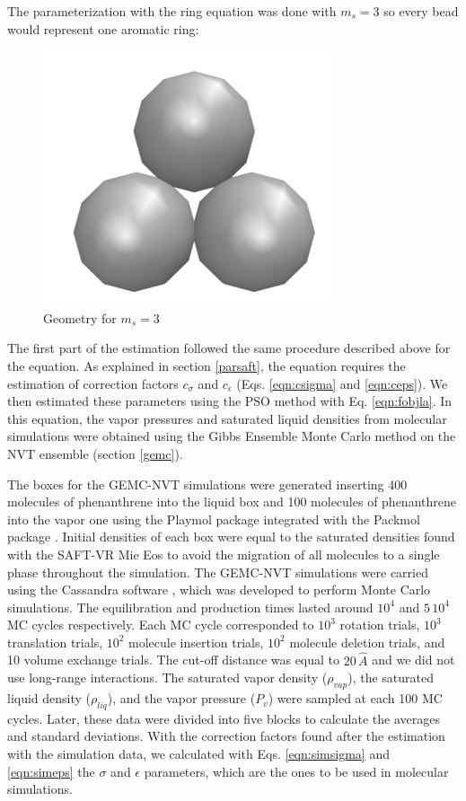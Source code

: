 The parameterization with the  ring equation was done with $m_{s}=3$ so every bead would represent one aromatic ring:

\begin{figure}[th]
	\centering
	\includegraphics[width=0.15\linewidth]{Figures/fe3}
	\caption{Geometry for $m_{s}=3$}
	\label{fig:fen3}
\end{figure}

The first part of the estimation followed the same procedure described above for the  equation. As explained in section \ref{parsaft}, the  equation requires the estimation of correction factors $c_{\sigma}$ and $c_{\epsilon}$ (Eqs. \eqref{eqn:csigma} and \eqref{eqn:ceps}). We then estimated these parameters using the PSO method with Eq. \eqref{eqn:fobjla}. In this equation, the vapor pressures and saturated liquid densities from molecular simulations were obtained using the Gibbs Ensemble Monte Carlo method on the NVT ensemble  (section \ref{gemc}).

The boxes for the GEMC-NVT simulations were generated inserting 400 molecules of phenanthrene into the liquid box and 100 molecules of phenanthrene into the vapor one using the Playmol package \cite{playmol} integrated with the Packmol package \cite{packmol}. Initial densities of each box were equal to the saturated densities found with the SAFT-VR Mie Eos to avoid the migration of all molecules to a single phase throughout the simulation. The GEMC-NVT simulations were carried using the Cassandra software \cite{doi:10.1063/1.3644939},  which was developed to perform Monte Carlo simulations. The equilibration and production times lasted around  $10^{4}$ and $5 \, 10^{4}$ MC cycles respectively. Each MC cycle corresponded to $10^3$ rotation trials, $10^3$ translation trials, $10^2$ molecule insertion trials, $10^2$ molecule deletion trials, and 10 volume exchange trials. The cut-off distance was equal to $20 \, \hat{A}$ and we did not use long-range interactions. The saturated vapor density ($\rho_{vap}$), the saturated liquid density ($\rho_{liq}$), and the vapor pressure ($P_{v}$) were sampled at each 100 MC cycles. Later, these data were divided into five blocks to calculate the averages and standard deviations. With the correction factors found after the estimation with the simulation data, we calculated with Eqs. \eqref{eqn:simsigma} and \eqref{eqn:simeps} the $\sigma$ and $\epsilon$ parameters, which are the ones to be used in molecular simulations.


